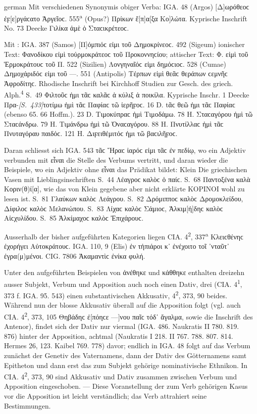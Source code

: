 \begin{otherlanguage*}{german}
Mit verschiedenen Synonymis obiger Verba: IGA. 48 (Argos) [Δ]ωρόθεοϲ ἐ\-ϝ[ε]ρ\-γά\-ϲα\-το Ἀργεῖοϲ. 555\textsuperscript{a} (Opus?) Πρίκων ἔ[π]α[ξα Κο]λώτα. Kyprische Inschrift No. 73 Deecke Γιλίκα ἁμὲ  ὁ Σταϲικρέτεοϲ.

Mit : IGA. 387 (Samos) [Π]όμπιόϲ εἰμι τοῦ Δημοκρίνεοϲ. 492 (Sigeum) ionischer Text: Φανοδίκου εἰμὶ τοὐρμοκράτεοϲ τοῦ Προκοννηϲίου; attischer Text: Φ. εἰμὶ τοῦ Ἑρμοκράτουϲ τοῦ Π. 522 (Sizilien) Λονγηναῖόϲ εἰμι δημόϲιοϲ. 528 (Cumae) Δημοχάριδόϲ εἰμι τοῦ —. 551 (Antipolis) Τέρπων εἰμὶ θεᾶϲ θεράπων ϲεμνῆϲ Ἀφροδίτηϲ. Rhodische Inschrift bei Kirchhoff Studien zur Gesch. des griech. Alph.\textsuperscript{4} S.~49 Φιλτοῦϲ ἠμι τᾶϲ καλᾶϲ ἁ κύλιξ ἁ ποικίλα. Kyprische Inschr. 1 Deecke Πρα-\hypertarget{p433}{\emph{[S.~433]}}\label{p433}τοτίμω ἠμὶ τᾶϲ Παφίαϲ τῶ ἰερῆϝοϲ. 16 D. tᾶϲ θεῶ ἠμι τᾶϲ Παφίαϲ (ebenso 65. 66 Hoffm.). 23 D. Τιμοκύπραϲ ἠμὶ Τιμοδάμω. 78 Η. Σταϲαγόρου ἠμὶ τῶ Σταϲάνδρω. 79 Η. Τιμάνδρω ἠμὶ τῶ Ὀναϲαγόρου. 88 Η. Πνυτίλλαϲ ἠμὶ τᾶϲ Πνυταγόραυ παιδόϲ. 121 Η. Διϝειθέμιτόϲ ἠμι τῶ βαϲιλῆϝοϲ.

Daran schliesst sich IGA. 543 τᾶϲ Ἥραϲ ἱαρόϲ εἰμι τᾶϲ ἐν πεδίῳ, wo ein Adjektiv verbunden mit εἶναι die Stelle des Verbums vertritt, und daran wieder die Beispiele, wo ein Adjektiv ohne εἶναι das Prädikat bildet: Klein Die griechischen Vasen mit Lieblingsinschriften S.~44 Λέαγροϲ καλὸϲ ὁ παίϲ. S.~68 Παντοξένα καλὰ Κοριν(θ)ί[α], wie das von Klein gegebene aber nicht erklärte ΚΟΡΙΝΟΙ wohl zu lesen ist. S.~81 Γλαύκων καλὸϲ Λεάγρου. S.~82 Δρόμιπποϲ καλὸϲ Δρομοκλείδου, Δίφιλοϲ καλὸϲ Μελανώπου. S.~83 Λίχαϲ καλὸϲ Σάμιοϲ, Ἀλκιμ[ή]δηϲ καλὸϲ Αἰϲχυλίδου. S.~85 Ἀλκίμαχοϲ καλὸϲ Ἐπιχάρουϲ.

Ausserhalb der bisher aufgeführten Kategorien liegen CIA. 4\textsuperscript{2}, 337\textsuperscript{a} Κλειϲθένηϲ ἐχορήγει Αὐτοκράτουϲ. IGA. 110, 9 (Elis) ἐν τἠπιάροι κ᾽ ἐνέχοιτο τοῖ ᾽νταῦτ᾽ ἐγρα(μ)μένοι. CIG. 7806 Ἀκαμαντὶϲ ἐνίκα φυλή.

Unter den aufgeführten Beispielen von ἀνέθηκε und κάθθηκε enthalten dreizehn ausser Subjekt, Verbum und Apposition auch noch einen Dativ, drei (CIA. 4\textsuperscript{1}, 373 f. IGA. 95. 543) einen substantivischen Akkusativ, 4\textsuperscript{2}, 373, 90 beides. Während nun der blosse Akkusativ überall auf die Apposition folgt (vgl. auch CIA. 4\textsuperscript{2}, 373, 105 Θηβάδηϲ ἐ[πόηϲε —]νου παῖϲ τόδ᾽ ἄγαλμα, sowie die Inschrift des Antenor), findet sich der Dativ nur viermal (IGA. 486. Naukratis II 780. 819. 876) hinter der Apposition, achtmal (Naukratis I 218. II 767. 788. 807. 814. Hermes 26, 123. Kaibel 769. 778) davor; endlich in IGA. 48 folgt auf das Verbum zunächst der Genetiv des Vaternamens, dann der Dativ des Götternamens samt Epitheton und dann erst das zum Subjekt gehörige nominativische Ethnikon. In CIA. 4\textsuperscript{2}, 373, 90 sind Akkusativ und Dativ zusammen zwischen Verbum und Apposition eingeschoben. — Diese Voranstellung der zum Verb gehörigen Kasus vor die Apposition ist leicht verständlich; das Verb attrahiert seine Bestimmungen.


\end{otherlanguage*}
